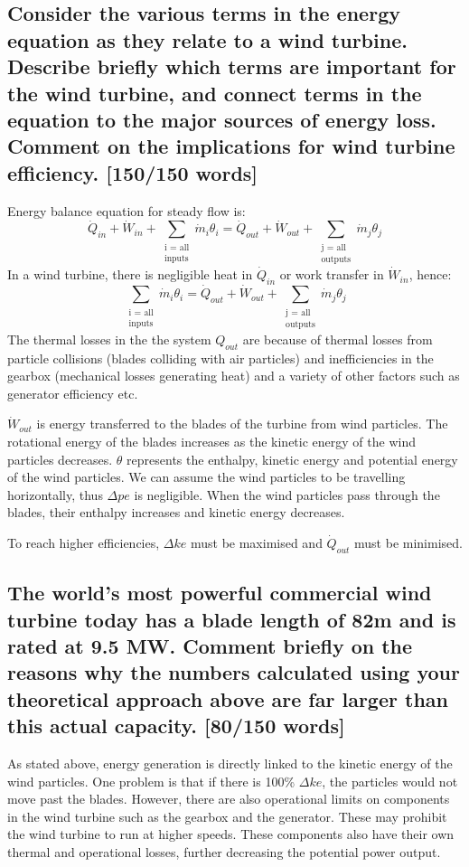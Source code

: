 \documentclass[12pt]{article}
\numberwithin{equation}{section}
\begin{document}
\begin{flushleft}
\subsection[Terms important for wind turbine.]{Consider the various terms in the energy equation as they relate to a wind turbine. Describe briefly which terms are important for the wind turbine, and connect terms in the equation to the major sources of energy loss. Comment on the implications for wind turbine efficiency. [150/150 words]}
Energy balance equation for steady flow is:
\begin{equation}
  \dot{Q}_{in} + \dot{W}_{in} + \sum_{\substack{\text{i = all} \\ \text{inputs}}} \dot{m}_i \theta_i = \dot{Q}_{out} + \dot{W}_{out} + \sum_{\substack{\text{j = all} \\ \text{outputs}}} \dot{m}_j \theta_j 
\end{equation}
In a wind turbine, there is negligible heat in $\dot{Q}_{in}$ or work transfer in $\dot{W}_{in}$, hence:
\begin{equation}
  \sum_{\substack{\text{i = all} \\ \text{inputs}}} \dot{m}_i \theta_i =  \dot{Q}_{out} + \dot{W}_{out} + \sum_{\substack{\text{j = all} \\ \text{outputs}}} \dot{m}_j \theta_j 
\end{equation}
The thermal losses in the the system $\si{Q}_{out}$ are because of thermal losses from particle collisions (blades colliding with air particles) and inefficiencies in the gearbox (mechanical losses generating heat) and a variety of other factors such as generator efficiency etc.

$\dot{W}_{out}$ is energy transferred to the blades of the turbine from wind particles. The rotational energy of the blades increases as the kinetic energy of the wind particles decreases. $\theta$ represents the enthalpy, kinetic energy and potential energy of the wind particles. We can assume the wind particles to be travelling horizontally, thus $\Delta pe$ is negligible. When the wind particles pass through the blades, their enthalpy increases and kinetic energy decreases. 

To reach higher efficiencies, $\Delta ke$ must be maximised and $\dot{Q}_{out}$ must be minimised.
\subsection[Power value discrepancies.]{The world’s most powerful commercial wind turbine today has a blade length of 82m and is rated at 9.5 MW. Comment briefly on the reasons why the numbers calculated using your theoretical approach above are far larger than this actual capacity. [80/150 words]}
As stated above, energy generation is directly linked to the kinetic energy of the wind particles. One problem is that if there is 100\% $\Delta ke$, the particles would not move past the blades. However, there are also operational limits on components in the wind turbine such as the gearbox and the generator. These may prohibit the wind turbine to run at higher speeds. These components also have their own thermal and operational losses, further decreasing the potential power output.


\end{flushleft}
\end{document}
